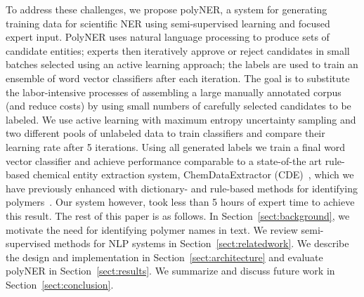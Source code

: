 To address these challenges, we propose polyNER, a system for generating training data for scientific NER using semi-supervised learning and focused expert input. 
PolyNER uses natural language processing to produce sets of candidate entities;
experts then iteratively approve or reject candidates in small batches selected using an active learning approach;
the labels are used to train an ensemble of word vector classifiers after each iteration.
The goal is
to substitute the labor-intensive processes of assembling a large
manually annotated corpus (and reduce costs) by using small numbers of carefully selected candidates to be labeled. 
We use active learning with maximum entropy uncertainty sampling and two different pools of unlabeled data to train classifiers and compare their learning rate after 5 iterations. 
Using all generated labels we train a final word vector classifier and achieve performance comparable to 
a state-of-the art rule-based chemical entity extraction
system, ChemDataExtractor (CDE)~\cite{swain2016chemdataextractor}, which we have previously enhanced
with dictionary- and rule-based methods for identifying polymers~\cite{tchoua2017towards}.
Our system however, took less than 5 hours of expert time to achieve this result.
The rest of this paper is as follows. 
In Section~\ref{sect:background}, we motivate the need for identifying polymer names in
text. 
We review semi-supervised methods for NLP systems in
Section~\ref{sect:relatedwork}. 
We describe the design and implementation in Section~\ref{sect:architecture} and evaluate polyNER
in Section~\ref{sect:results}. We summarize and discuss future work in Section~\ref{sect:conclusion}.